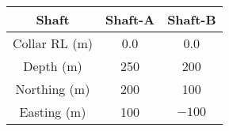 \begin{tabular}[12pt]{ |c|c|c| }
    \hline
    \textbf{Shaft} & \textbf{Shaft-A} & \textbf{Shaft-B} \\
    \hline
    Collar RL (m) & 0.0 & 0.0 \\
    \hline
    Depth (m) & 250 & 200 \\
    \hline
    Northing (m) & 200 & 100 \\
    \hline
    Easting (m) & 100 & $-100$ \\
    \hline
\end{tabular}
